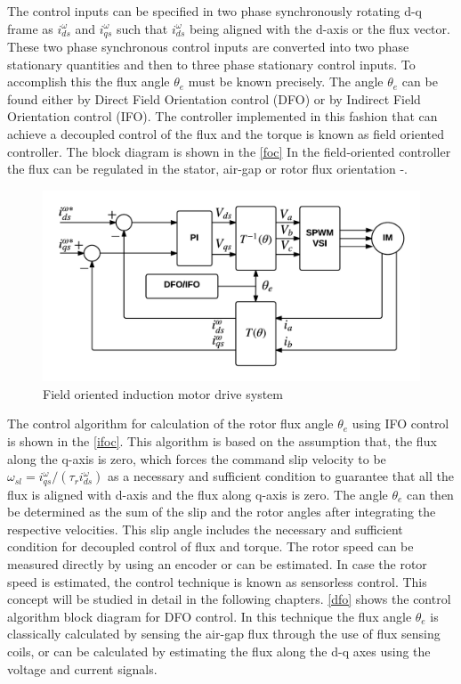 The control inputs can be specified in two phase synchronously rotating d-q frame as $i_{ds}^{\omega}$ and $i_{qs}^{\omega}$ such that $i_{ds}^{\omega}$ being aligned with the d-axis or the flux vector. These two phase synchronous control inputs are converted into two phase stationary quantities and then to three phase stationary control inputs. To accomplish this the flux angle $\theta_{e}$ must be known precisely. The angle $\theta_{e}$ can be found either by Direct Field Orientation control (DFO) or by Indirect Field Orientation control (IFO). The controller implemented in this fashion that can achieve a decoupled control of the flux and the torque is known as field oriented controller. The block diagram is shown in the \autoref{foc} In the field-oriented controller the flux can be regulated in the stator, air-gap or rotor flux orientation \cite{Vas}-\cite{Lipo}.


\begin{figure}[h]
\centering
\includegraphics[scale=0.73]{chapter0/foc}
\caption{Field oriented induction motor drive system}
\label{foc}
\end{figure}

The control algorithm for calculation of the rotor flux angle $\theta_{e}$ using IFO control is shown in the \autoref{ifoc}. This algorithm is based on the assumption that, the flux along the q-axis is zero, which forces the command slip velocity to be $\omega_{sl}=i_{qs}^{\omega}/(\tau_{r}i_{ds}^{\omega})$ as a necessary and sufficient condition to guarantee that all the flux is aligned with d-axis and the flux along q-axis is zero. The angle $\theta_{e}$ can then be determined as the sum of the slip and the rotor angles after integrating the respective velocities. This slip angle includes the necessary and sufficient condition for decoupled control of flux and torque. The rotor speed can be measured directly by using an encoder or can be estimated. In case the rotor speed is estimated, the control technique is known as sensorless control. This concept will be studied in detail in the following chapters. \autoref{dfo} shows the control algorithm block diagram for DFO control. In this technique the flux angle $\theta_{e}$ is classically calculated by sensing the air-gap flux through the use of flux sensing coils, or can be calculated by estimating the flux along the d-q axes using the voltage and current signals.

